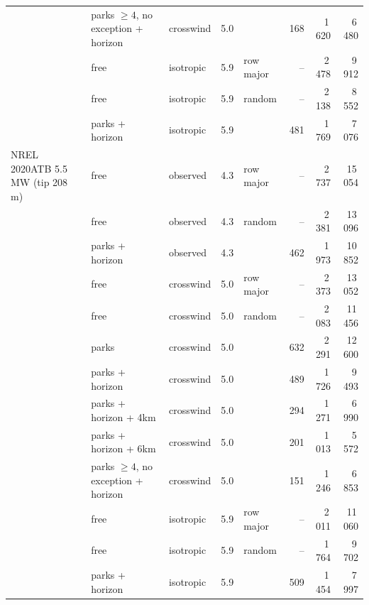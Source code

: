 \begin{tabular}{lllrlrrr}
 & parks $\geq 4$, no exception + horizon & crosswind & 5.0 &  & 168 & 1\,620 & 6\,480 \\
 & free & isotropic & 5.9 & row major & -- & 2\,478 & 9\,912 \\
 & free & isotropic & 5.9 & random & -- & 2\,138 & 8\,552 \\
 & parks + horizon & isotropic & 5.9 &  & 481 & 1\,769 & 7\,076 \\
\midrule
NREL 2020ATB 5.5 MW (tip 208 m) & free & observed & 4.3 & row major & -- & 2\,737 & 15\,054 \\
 & free & observed & 4.3 & random & -- & 2\,381 & 13\,096 \\
 & parks + horizon & observed & 4.3 &  & 462 & 1\,973 & 10\,852 \\
 & free & crosswind & 5.0 & row major & -- & 2\,373 & 13\,052 \\
 & free & crosswind & 5.0 & random & -- & 2\,083 & 11\,456 \\
 & parks & crosswind & 5.0 &  & 632 & 2\,291 & 12\,600 \\
 & parks + horizon & crosswind & 5.0 &  & 489 & 1\,726 & 9\,493 \\
 & parks + horizon + 4km & crosswind & 5.0 &  & 294 & 1\,271 & 6\,990 \\
 & parks + horizon + 6km & crosswind & 5.0 &  & 201 & 1\,013 & 5\,572 \\
 & parks $\geq 4$, no exception + horizon & crosswind & 5.0 &  & 151 & 1\,246 & 6\,853 \\
 & free & isotropic & 5.9 & row major & -- & 2\,011 & 11\,060 \\
 & free & isotropic & 5.9 & random & -- & 1\,764 & 9\,702 \\
 & parks + horizon & isotropic & 5.9 &  & 509 & 1\,454 & 7\,997 \\
\bottomrule
\end{tabular}